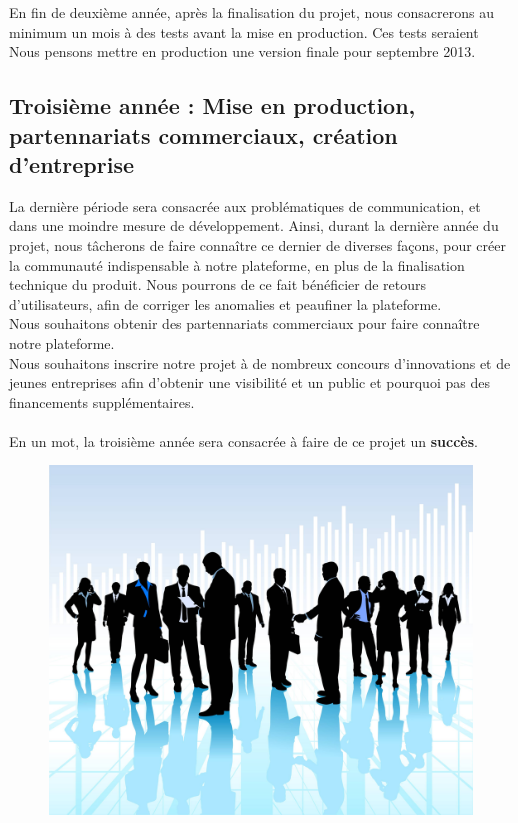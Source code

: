 \documentclass{life-fr}
\begin{document}
En fin de deuxième année, après la finalisation du projet, nous consacrerons au minimum un mois à des tests avant la mise en production. Ces tests seraient \\
Nous pensons mettre en production une version finale pour septembre 2013.\\

\subsection{ Troisième année : Mise en production, partennariats commerciaux, création d'entreprise}

La dernière période sera consacrée aux problématiques de communication, et dans une moindre mesure de développement. Ainsi, durant la dernière année du projet, nous tâcherons de faire connaître ce dernier de diverses façons, pour créer la communauté indispensable à notre plateforme, en plus de la finalisation technique du produit. Nous pourrons de ce fait bénéficier de retours d'utilisateurs, afin de corriger les anomalies et peaufiner la plateforme.\\
Nous souhaitons obtenir des partennariats commerciaux pour faire connaître notre plateforme.\\
Nous souhaitons inscrire notre projet à de nombreux concours d'innovations et de jeunes entreprises afin d'obtenir une visibilité et un public et pourquoi pas des financements supplémentaires.\\
\\
En un mot, la troisième année sera consacrée à faire de ce projet un \textbf{succès}.

\begin{figure}[H]
  \begin{center}
    \includegraphics[width=12cm]{img/corporate.jpg}
  \end{center}
\end{figure}
\end{document}
